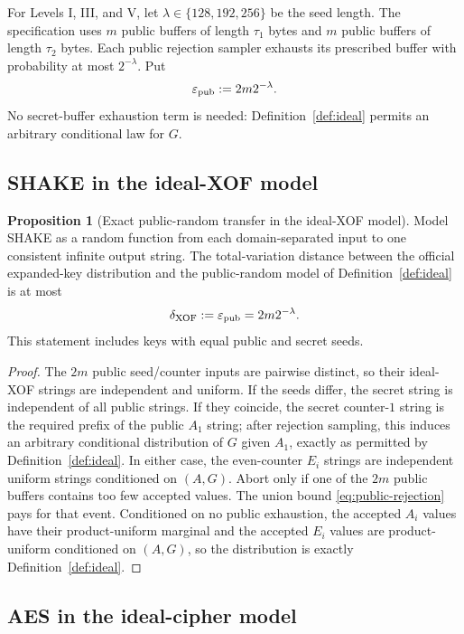 \documentclass[11pt,a4paper]{article}
\theoremstyle{definition}
\newtheorem{proposition}[theorem]{Proposition}
\theoremstyle{remark}
\begin{document}
For Levels I, III, and V, let $\lambda\in\{128,192,256\}$ be the seed length.  The specification uses $m$ public buffers of length $\tau_1$ bytes and $m$ public buffers of length $\tau_2$ bytes.  Each public rejection sampler exhausts its prescribed buffer with probability at most $2^{-\lambda}$.  Put
\begin{equation}\label{eq:public-rejection}
\varepsilon_{\rm pub}:=2m2^{-\lambda}.
\end{equation}
No secret-buffer exhaustion term is needed: Definition~\ref{def:ideal} permits an arbitrary conditional law for $G$.

\subsection{SHAKE in the ideal-XOF model}

\begin{proposition}[Exact public-random transfer in the ideal-XOF model]\label{prop:rom-transfer}
Model SHAKE as a random function from each domain-separated input to one consistent infinite output string.  The total-variation distance between the official expanded-key distribution and the public-random model of Definition~\ref{def:ideal} is at most
\[
\delta_{\rm XOF}:=\varepsilon_{\rm pub}=2m2^{-\lambda}.
\]
This statement includes keys with equal public and secret seeds.
\end{proposition}

\begin{proof}
The $2m$ public seed/counter inputs are pairwise distinct, so their ideal-XOF strings are independent and uniform.  If the seeds differ, the secret string is independent of all public strings.  If they coincide, the secret counter-$1$ string is the required prefix of the public $A_1$ string; after rejection sampling, this induces an arbitrary conditional distribution of $G$ given $A_1$, exactly as permitted by Definition~\ref{def:ideal}.  In either case, the even-counter $E_i$ strings are independent uniform strings conditioned on $(A,G)$.  Abort only if one of the $2m$ public buffers contains too few accepted values.  The union bound \eqref{eq:public-rejection} pays for that event.  Conditioned on no public exhaustion, the accepted $A_i$ values have their product-uniform marginal and the accepted $E_i$ values are product-uniform conditioned on $(A,G)$, so the distribution is exactly Definition~\ref{def:ideal}.
\end{proof}

\subsection{AES in the ideal-cipher model}
\end{document}
